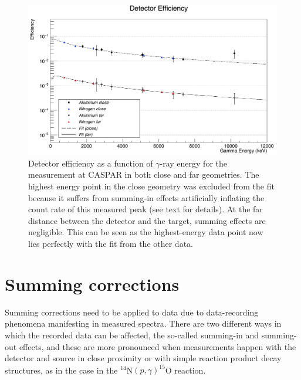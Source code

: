 \begin{figure}
\centering
\includegraphics[width=\linewidth]{figures/efficiencyComplete.png}
\caption{Detector efficiency as a function of $\gamma$-ray energy for the measurement at CASPAR in both close and far geometries. The highest energy point in the close geometry was excluded from the fit because it suffers from summing-in effects artificially inflating the count rate of this measured peak (see text for details). At the far distance between the detector and the target, summing effects are negligible. This can be seen as the highest-energy data point now lies perfectly with the fit from the other data.  }
\label{fig: efficiency}
\end{figure}



\section{Summing corrections}
\label{sec: summing}

Summing corrections need to be applied to data due to data-recording phenomena manifesting in measured spectra. There are two different ways in which the recorded data can be affected, the so-called summing-in and summing-out effects, and these are more pronounced when measurements happen with the detector and source in close proximity or with simple reaction product decay structures, as in the case in the $^{14}$N$\left( p,\gamma \right) ^{15}$O reaction.


